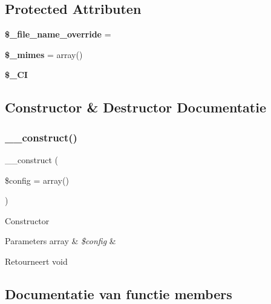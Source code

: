 \subsection*{Protected Attributen}
\begin{DoxyCompactItemize}
\item 
\mbox{\label{class_c_i___upload_a9f09c7cb693d391de63f9c8e91f159e1}} 
{\bfseries \$\+\_\+file\+\_\+name\+\_\+override} = \textquotesingle{}\textquotesingle{}
\item 
\mbox{\label{class_c_i___upload_a7cc0f09266cdbeff9d73c31b88d5af87}} 
{\bfseries \$\+\_\+mimes} = array()
\item 
\mbox{\label{class_c_i___upload_a9b6039aa2ad20924954fde50a2db8d26}} 
{\bfseries \$\+\_\+\+CI}
\end{DoxyCompactItemize}


\subsection{Constructor \& Destructor Documentatie}
\mbox{\label{class_c_i___upload_af7f9493844d2d66e924e3c1df51ce616}} 
\subsubsection{\texorpdfstring{\_\_construct()}{\_\_construct()}}
{\footnotesize\ttfamily \+\_\+\+\_\+construct (\begin{DoxyParamCaption}\item[{}]{\$config = {\ttfamily array()} }\end{DoxyParamCaption})}

Constructor


\begin{DoxyParams}[1]{Parameters}
array & {\em \$config} & \\
\hline
\end{DoxyParams}
\begin{DoxyReturn}{Retourneert}
void 
\end{DoxyReturn}


\subsection{Documentatie van functie members}
\mbox{\label{class_c_i___upload_a8ac4511eca70b271965b7f8ef00faf66}} 

